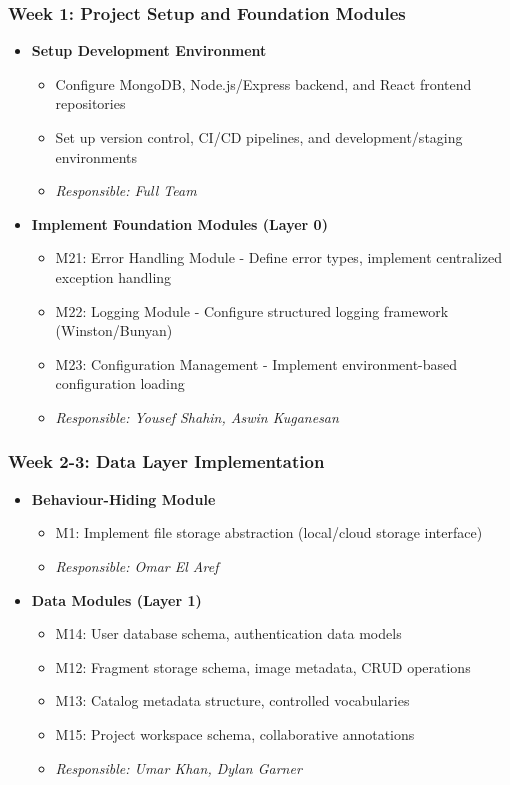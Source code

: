 \documentclass[12pt, titlepage]{article}
\begin{document}
\subsubsection{Week 1: Project Setup and Foundation Modules}
\begin{itemize}
    \item \textbf{Setup Development Environment}
    \begin{itemize}
        \item Configure MongoDB, Node.js/Express backend, and React frontend repositories
        \item Set up version control, CI/CD pipelines, and development/staging environments
        \item \textit{Responsible: Full Team}
    \end{itemize}
    \item \textbf{Implement Foundation Modules (Layer 0)}
    \begin{itemize}
        \item M21: Error Handling Module - Define error types, implement centralized exception handling
        \item M22: Logging Module - Configure structured logging framework (Winston/Bunyan)
        \item M23: Configuration Management - Implement environment-based configuration loading
        \item \textit{Responsible: Yousef Shahin, Aswin Kuganesan}
    \end{itemize}
\end{itemize}

\subsubsection{Week 2-3: Data Layer Implementation}
\begin{itemize}
    \item \textbf{Behaviour-Hiding Module}
    \begin{itemize}
        \item M1: Implement file storage abstraction (local/cloud storage interface)
        \item \textit{Responsible: Omar El Aref}
    \end{itemize}
    \item \textbf{Data Modules (Layer 1)}
    \begin{itemize}
        \item M14: User database schema, authentication data models
        \item M12: Fragment storage schema, image metadata, CRUD operations
        \item M13: Catalog metadata structure, controlled vocabularies
        \item M15: Project workspace schema, collaborative annotations
        \item \textit{Responsible: Umar Khan, Dylan Garner}
    \end{itemize}
\end{itemize}
\end{document}

